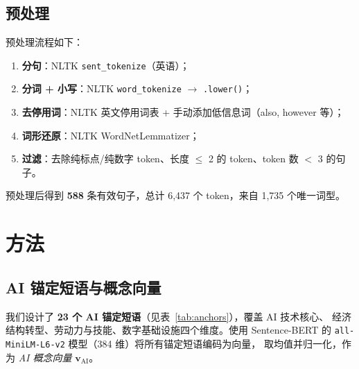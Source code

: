 \documentclass[11pt,a4paper]{article}
\begin{document}
\subsection{预处理}

预处理流程如下：
\begin{enumerate}[nosep]
    \item \textbf{分句}：NLTK \texttt{sent\_tokenize}（英语）；
    \item \textbf{分词 + 小写}：NLTK \texttt{word\_tokenize} $\to$ \texttt{.lower()}；
    \item \textbf{去停用词}：NLTK 英文停用词表 + 手动添加低信息词（also, however 等）；
    \item \textbf{词形还原}：NLTK WordNetLemmatizer；
    \item \textbf{过滤}：去除纯标点/纯数字 token、长度 $\le$ 2 的 token、token 数 $<$ 3 的句子。
\end{enumerate}

预处理后得到 \textbf{588} 条有效句子，总计 6,437 个 token，来自 1,735 个唯一词型。

\section{方法}

\subsection{AI 锚定短语与概念向量}

我们设计了 \textbf{23 个 AI 锚定短语}（见表~\ref{tab:anchors}），覆盖 AI 技术核心、
经济结构转型、劳动力与技能、数字基础设施四个维度。使用 Sentence-BERT 的
\texttt{all-MiniLM-L6-v2} 模型（384 维）将所有锚定短语编码为向量，
取均值并归一化，作为 \emph{AI 概念向量} $\mathbf{v}_{\text{AI}}$。
\end{document}
